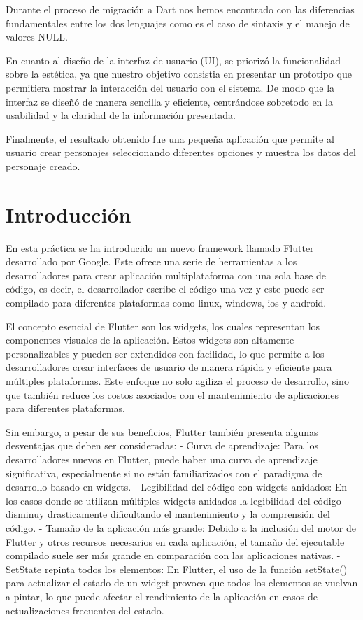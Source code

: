 \documentclass{article}
\begin{document}
Durante el proceso de migración a Dart nos hemos encontrado con las diferencias fundamentales entre los dos lenguajes como es el caso de sintaxis y el manejo de valores NULL.

En cuanto al diseño de la interfaz de usuario (UI), se priorizó la funcionalidad sobre la estética, ya que nuestro objetivo consistia en presentar un prototipo que permitiera mostrar 
la interacción del usuario con el sistema. De modo que la interfaz se diseñó de manera sencilla y eficiente, centrándose sobretodo en la usabilidad y la claridad de la información presentada.

Finalmente, el resultado obtenido fue una pequeña aplicación que permite al usuario crear personajes seleccionando diferentes opciones y muestra los datos del personaje creado.


\section{Introducción}

En esta práctica se ha introducido un nuevo framework llamado Flutter desarrollado por Google. Este ofrece una serie de herramientas a los desarrolladores para 
crear aplicación multiplataforma con una sola base de código, es decir, el desarrollador escribe el código una vez y este puede ser compilado para diferentes plataformas como linux, windows, ios y android.

El concepto esencial de Flutter son los widgets, los cuales representan los componentes visuales de la aplicación. 
Estos widgets son altamente personalizables y pueden ser extendidos con facilidad, lo que permite a los desarrolladores crear interfaces
de usuario de manera rápida y eficiente para múltiples plataformas. Este enfoque no solo agiliza el proceso de desarrollo, sino que también 
reduce los costos asociados con el mantenimiento de aplicaciones para diferentes plataformas.

Sin embargo, a pesar de sus beneficios, Flutter también presenta algunas desventajas que deben ser consideradas:
- Curva de aprendizaje: Para los desarrolladores nuevos en Flutter, puede haber una curva de aprendizaje significativa, especialmente si no están familiarizados con el paradigma de desarrollo basado en widgets.
- Legibilidad del código con widgets anidados: En los casos donde se utilizan múltiples widgets anidados la legibilidad del código disminuy drasticamente dificultando el mantenimiento y la comprensión del código.
- Tamaño de la aplicación más grande: Debido a la inclusión del motor de Flutter y otros recursos necesarios en cada aplicación, el tamaño del ejecutable compilado suele ser más grande en comparación con las aplicaciones nativas.
- SetState repinta todos los elementos: En Flutter, el uso de la función setState() para actualizar el estado de un widget provoca que todos los elementos se vuelvan a pintar, lo que puede afectar el rendimiento de la aplicación en casos de actualizaciones frecuentes del estado.
\end{document}
